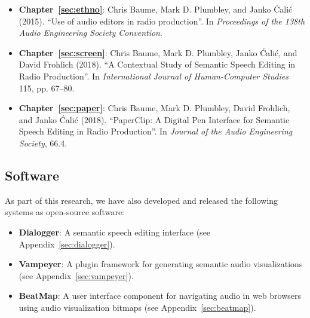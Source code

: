 
\nocite{Baume2015,Baume2018a,Baume2018}
\begin{itemize}
  \item \textbf{Chapter~\ref{sec:ethno}}: Chris Baume, Mark D. Plumbley, and Janko \'{C}ali\'{c} (2015). ``Use of audio
    editors in radio production''. In \textit{Proceedings of the 138th Audio Engineering Society Convention}.
  \item \textbf{Chapter~\ref{sec:screen}}: Chris Baume, Mark D. Plumbley, Janko \'{C}ali\'{c}, and David Frohlich
    (2018). ``A Contextual Study of Semantic Speech Editing in Radio Production''. In \textit{International Journal of
    Human-Computer Studies} 115, pp. 67--80.
  \item \textbf{Chapter~\ref{sec:paper}}: Chris Baume, Mark D. Plumbley, David Frohlich, and Janko \'{C}ali\'{c}
    (2018).  ``PaperClip: A Digital Pen Interface for Semantic Speech Editing in Radio Production''. In \textit{Journal
    of the Audio Engineering Society}, 66.4.   
\end{itemize}

\subsection*{Software}
As part of this research, we have also developed and released the following systems as open-source software:

\begin{itemize}
  \item \textbf{Dialogger}: A semantic speech editing interface (see Appendix~\ref{sec:dialogger}).
  \item \textbf{Vampeyer}: A plugin framework for generating semantic audio visualizations (see
    Appendix~\ref{sec:vampeyer}).
  \item \textbf{BeatMap}: A user interface component for navigating audio in web browsers using audio visualization
    bitmaps (see Appendix~\ref{sec:beatmap}).
\end{itemize}

